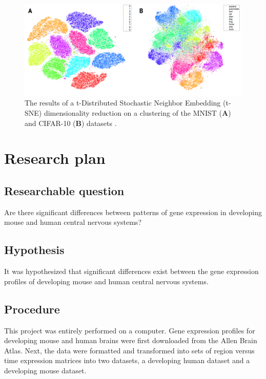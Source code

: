 \documentclass[12pt,oneside,onecolumn,a4paper]{article}
\begin{document}
\begin{figure}[H]
\begin{center}
\includegraphics[width=0.8\columnwidth]{figures/tsne}
\caption{The results of a t-Distributed Stochastic Neighbor Embedding (t-SNE) dimensionality reduction on a clustering of the MNIST (\textbf{A}) and CIFAR-10 (\textbf{B}) datasets \citep{laurensvandermaaten2014}. \label{fig:clusters}%
}
\end{center}
\end{figure}

\section{Research plan}


\subsection{Researchable question}
Are there significant differences between patterns of gene expression in developing mouse and human central nervous systems?

\subsection{Hypothesis}

It was hypothesized that significant differences exist between the gene expression profiles of developing mouse and human central nervous systems.

\subsection{Procedure}
This project was entirely performed on a computer. Gene expression profiles for developing mouse and human brains were first downloaded from the Allen Brain Atlas. Next, the data were formatted and transformed into sets of region versus time expression matrices into two datasets, a developing human dataset and a developing mouse dataset. 
\end{document}
